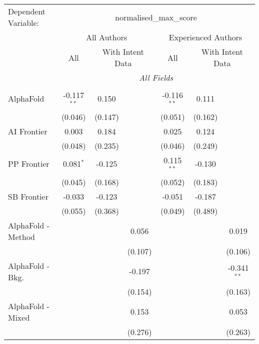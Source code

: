 \begingroup
\centering
\begin{tabular}{lcccccc}
   \tabularnewline \midrule \midrule
   Dependent Variable: & \multicolumn{6}{c}{normalised\_max\_score}\\
 & \multicolumn{3}{c}{All Authors} & \multicolumn{3}{c}{Experienced Authors} \\
\cmidrule(lr){2-4} \cmidrule(lr){5-7}
 & \multicolumn{1}{c}{All} & \multicolumn{2}{c}{With Intent Data} & \multicolumn{1}{c}{All} & \multicolumn{2}{c}{With Intent Data} \\
\cmidrule(lr){2-2} \cmidrule(lr){3-4} \cmidrule(lr){5-5} \cmidrule(lr){6-7}
 & \multicolumn{6}{c}{\textit{All Fields}} \\ \\
   AlphaFold            & -0.117$^{**}$ & 0.150   &         & -0.116$^{**}$ & 0.111   &   \\   
                        & (0.046)       & (0.147) &         & (0.051)       & (0.162) &   \\   
   AI Frontier          & 0.003         & 0.184   &         & 0.025         & 0.124   &   \\   
                        & (0.048)       & (0.235) &         & (0.046)       & (0.249) &   \\   
   PP Frontier          & 0.081$^{*}$   & -0.125  &         & 0.115$^{**}$  & -0.130  &   \\   
                        & (0.045)       & (0.168) &         & (0.052)       & (0.183) &   \\   
   SB Frontier          & -0.033        & -0.123  &         & -0.051        & -0.187  &   \\   
                        & (0.055)       & (0.368) &         & (0.049)       & (0.489) &   \\   
   AlphaFold - Method   &               &         & 0.056   &               &         & 0.019\\   
                        &               &         & (0.107) &               &         & (0.106)\\   
   AlphaFold - Bkg.     &               &         & -0.197  &               &         & -0.341$^{**}$\\   
                        &               &         & (0.154) &               &         & (0.163)\\   
   AlphaFold - Mixed    &               &         & 0.153   &               &         & 0.053\\   
                        &               &         & (0.276) &               &         & (0.263)\\   

\end{tabular}
